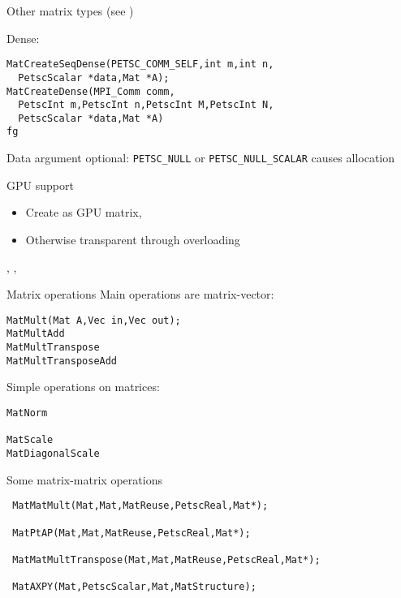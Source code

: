 \begin{details}
\begin{numberedframe}{Other matrix types}
(see )

Dense:
\begin{lstlisting}
MatCreateSeqDense(PETSC_COMM_SELF,int m,int n,
  PetscScalar *data,Mat *A);
MatCreateDense(MPI_Comm comm,
  PetscInt m,PetscInt n,PetscInt M,PetscInt N,
  PetscScalar *data,Mat *A)
fg\end{lstlisting}
Data argument optional:
\lstinline{PETSC_NULL} or \lstinline{PETSC_NULL_SCALAR} causes allocation
\end{numberedframe}

\begin{numberedframe}{GPU support}
  \begin{itemize}
  \item Create as GPU matrix,
  \item Otherwise transparent through overloading
  \end{itemize}
,
,
\end{numberedframe}

\begin{numberedframe}{}
\end{numberedframe}

\begin{comment}
  \begin{numberedframe}{}
    \cverbatimsnippet{pccudaallocsp}
  \end{numberedframe}
\end{comment}

\end{details}

\begin{numberedframe}{Matrix operations}
Main operations are matrix-vector:
\begin{lstlisting}
MatMult(Mat A,Vec in,Vec out);
MatMultAdd
MatMultTranspose
MatMultTransposeAdd
\end{lstlisting}

Simple operations on matrices:
\begin{lstlisting}
MatNorm

MatScale
MatDiagonalScale
\end{lstlisting}
\end{numberedframe}

\begin{numberedframe}{Some matrix-matrix operations}
\begin{lstlisting}
 MatMatMult(Mat,Mat,MatReuse,PetscReal,Mat*);

 MatPtAP(Mat,Mat,MatReuse,PetscReal,Mat*);

 MatMatMultTranspose(Mat,Mat,MatReuse,PetscReal,Mat*);

 MatAXPY(Mat,PetscScalar,Mat,MatStructure);
\end{lstlisting}
\end{numberedframe}

